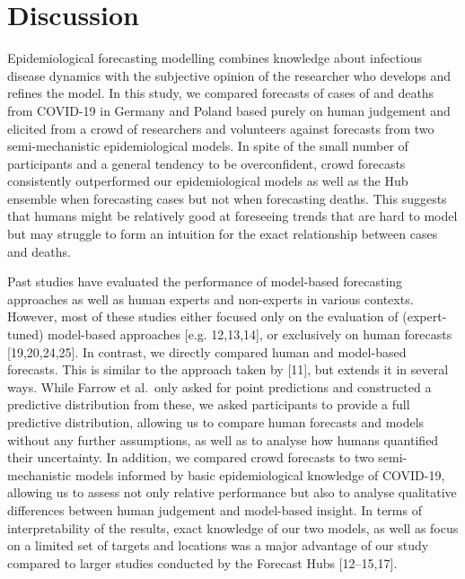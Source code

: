 \documentclass[10pt,letterpaper]{article}
\begin{document}
\hypertarget{discussion}{%
\section{Discussion}\label{discussion}}

Epidemiological forecasting modelling combines knowledge about
infectious disease dynamics with the subjective opinion of the
researcher who develops and refines the model. In this study, we
compared forecasts of cases of and deaths from COVID-19 in Germany and
Poland based purely on human judgement and elicited from a crowd of
researchers and volunteers against forecasts from two semi-mechanistic
epidemiological models. In spite of the small number of participants and
a general tendency to be overconfident, crowd forecasts consistently
outperformed our epidemiological models as well as the Hub ensemble when
forecasting cases but not when forecasting deaths. This suggests that
humans might be relatively good at foreseeing trends that are hard to
model but may struggle to form an intuition for the exact relationship
between cases and deaths.

Past studies have evaluated the performance of model-based forecasting
approaches as well as human experts and non-experts in various contexts.
However, most of these studies either focused only on the evaluation of
(expert-tuned) model-based approaches {[}e.g. 12,13,14{]}, or
exclusively on human forecasts {[}19,20,24,25{]}. In contrast, we
directly compared human and model-based forecasts. This is similar to
the approach taken by {[}11{]}, but extends it in several ways. While
Farrow et al.~only asked for point predictions and constructed a
predictive distribution from these, we asked participants to provide a
full predictive distribution, allowing us to compare human forecasts and
models without any further assumptions, as well as to analyse how humans
quantified their uncertainty. In addition, we compared crowd forecasts
to two semi-mechanistic models informed by basic epidemiological
knowledge of COVID-19, allowing us to assess not only relative
performance but also to analyse qualitative differences between human
judgement and model-based insight. In terms of interpretability of the
results, exact knowledge of our two models, as well as focus on a
limited set of targets and locations was a major advantage of our study
compared to larger studies conducted by the Forecast Hubs
{[}12--15,17{]}.
\end{document}
